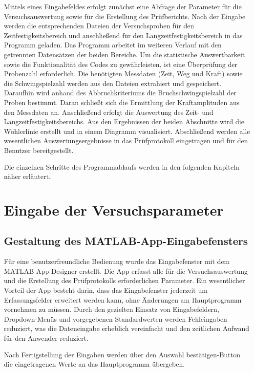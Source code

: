 Mittels eines Eingabefeldes erfolgt zunächst eine Abfrage der Parameter für die Versuchsauswertung sowie für die Erstellung des Prüfberichts. Nach der Eingabe werden die entsprechenden Dateien der Versuchsproben für den Zeitfestigkeitsbereich und anschließend für den Langzeitfestigkeitsbereich in das Programm geladen. Das Programm arbeitet im weiteren Verlauf mit den getrennten Datensätzen der beiden Bereiche. Um die statistische Auswertbarkeit sowie die Funktionalität des Codes zu gewährleisten, ist eine Überprüfung der Probenzahl erforderlich. Die benötigten Messdaten (Zeit, Weg und Kraft) sowie die Schwingspielzahl werden aus den Dateien extrahiert und gespeichert. Daraufhin wird anhand des Abbruchkriteriums die Bruchschwingspielzahl der Proben bestimmt. Daran schließt sich die Ermittlung der Kraftamplituden aus den Messdaten an. Anschließend erfolgt die Auswertung des Zeit- und Langzeitfestigkeitsbereichs. Aus den Ergebnissen der beiden Abschnitte wird die Wöhlerlinie erstellt und in einem Diagramm visualisiert. Abschließend werden alle wesentlichen Auswertungsergebnisse in das Prüfprotokoll eingetragen und für den Benutzer bereitgestellt.   

Die einzelnen Schritte des Programmablaufs werden in den folgenden Kapiteln näher erläutert. 


	\section{Eingabe der Versuchsparameter}
	\subsection{Gestaltung des MATLAB-App-Eingabefensters}
	Für eine benutzerfreundliche Bedienung wurde das Eingabefenster mit dem MATLAB App Designer erstellt. Die App erfasst alle für die Versuchsauswertung und die Erstellung des Prüfprotokolls erforderlichen Parameter.
	 Ein wesentlicher Vorteil der App besteht darin, dass das Eingabefenster jederzeit um Erfassungsfelder erweitert werden kann, ohne Änderungen am Hauptprogramm vornehmen zu müssen. Durch den gezielten Einsatz von Eingabefeldern, Dropdown-Menüs und vorgegebenen Standardwerten werden Fehleingaben reduziert, was die Dateneingabe erheblich vereinfacht und den zeitlichen Aufwand für den Anwender reduziert.
	 
	Nach Fertigstellung der Eingaben werden über den  \glqq Auswahl bestätigen\grqq{}-Button die eingetragenen Werte an das Hauptprogramm übergeben. 
	 
